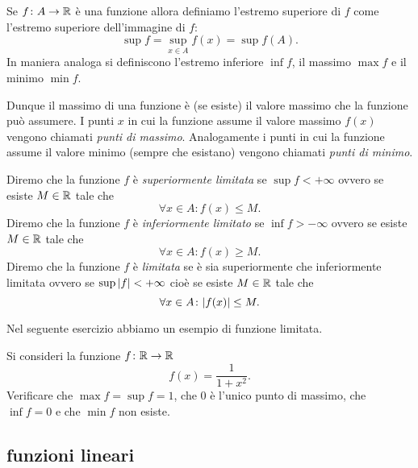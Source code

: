 \begin{definition}
\label{def:funzione_limitata}%
Se $f\colon A \to {\mathbb R}$ è una funzione allora definiamo
l'estremo superiore di $f$ come l'estremo superiore
dell'immagine di $f$:
\[
  \sup f = \sup_{x\in A} f(x) = \sup f(A).
\]
In maniera analoga si definiscono l'estremo inferiore $\inf f$,
il massimo $\max f$ e il minimo $\min f$.

Dunque il massimo di una funzione è (se esiste) il valore massimo
che la funzione può assumere. I punti $x$ in cui
la funzione assume il valore massimo $f(x)$ vengono chiamati
\emph{punti di massimo}.
%
%
%
%
Analogamente i punti in cui la funzione
assume il valore minimo (sempre che esistano) vengono
chiamati \emph{punti di minimo}.

Diremo che la funzione $f$ è
\emph{superiormente limitata}%
%
se $\sup f<+\infty$
ovvero se esiste $M\in {\mathbb R}$ tale che
\[
\forall x\in A \colon f(x) \le M.
\]
Diremo che la funzione $f$ è
\emph{inferiormente limitato}%
%
se $\inf f > -\infty$ ovvero se esiste $M\in {\mathbb R}$ tale che
\[
 \forall x \in A \colon f(x) \ge M.
\]
Diremo che la funzione $f$ è \emph{limitata}%
%
se è sia superiormente che inferiormente limitata ovvero
se $\sup{\left|f\right|}<+\infty$ cioè se esiste $M\in {\mathbb R}$ tale che
\[
\forall x \in A \colon {\left|f(x)\right|}\le M.
\]
\end{definition}

Nel seguente esercizio abbiamo un esempio di funzione limitata.
\begin{exercise}
Si consideri la funzione $f\colon {\mathbb R}\to{\mathbb R}$
\[
 f(x) = \frac{1}{1+x^2}.
\]
Verificare che $\max f = \sup f = 1$, che $0$ è l'unico punto di massimo,
che $\inf f = 0$ e che $\min f$ non esiste.
\end{exercise}

\subsection{funzioni lineari}

